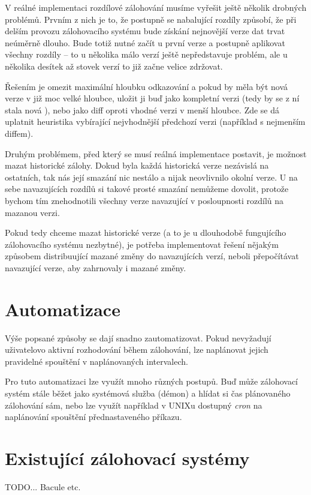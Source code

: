 V reálné implementaci rozdílové zálohování musíme vyřešit ještě několik drobných
problémů. Prvním z nich je to, že postupně se nabalující rozdíly způsobí, že
při delším provozu zálohovacího systému bude získání nejnovější verze dat trvat
neúměrně dlouho. Bude totiž nutné začít u první verze a postupně aplikovat
všechny rozdíly -- to u několika málo verzí ještě nepředstavuje problém, ale
u několika desítek až stovek verzí to již začne velice zdržovat.

Řešením je omezit maximální hloubku odkazování a pokud by měla být nová verze
v již moc velké hloubce, uložit ji buď jako kompletní verzi (tedy by se z ní
stala nová ), nebo jako diff oproti vhodné verzi v menší
hloubce. Zde se dá uplatnit heuristika vybírající nejvhodnější předchozí verzi
(například s nejmenším diffem).

Druhým problémem, před který se musí reálná implementace postavit, je možnost
mazat historické zálohy. Dokud byla každá historická verze nezávislá na
ostatních, tak nás její smazání nic nestálo a nijak neovlivnilo okolní verze.
U na sebe navazujících rozdílů si takové prosté smazání nemůžeme dovolit,
protože bychom tím znehodnotili všechny verze navazující v posloupnosti rozdílů
na mazanou verzi.

Pokud tedy chceme mazat historické verze (a to je u dlouhodobě fungujícího
zálohovacího systému nezbytné), je potřeba implementovat řešení nějakým
způsobem distribuující mazané změny do navazujících verzí, neboli přepočítávat
navazující verze, aby zahrnovaly i mazané změny.

\section{Automatizace}

Výše popsané způsoby se dají snadno zautomatizovat. Pokud nevyžadují uživatelovo
aktivní rozhodování během zálohování, lze naplánovat jejich pravidelné spouštění
v naplánovaných intervalech.

Pro tuto automatizaci lze využít mnoho různých postupů. Buď může zálohovací
systém stále běžet jako systémová služba (démon) a hlídat si čas plánovaného
zálohování sám, nebo lze využít například v \gls{UNIX}u dostupný {\it cron} na
naplánování spouštění přednastaveného příkazu.

\section{Existující zálohovací systémy}

TODO... Bacule etc.
